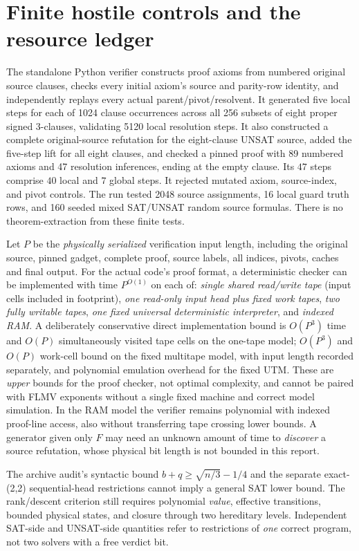\documentclass[11pt]{article}
\begin{document}
\section{Finite hostile controls and the resource ledger}
The standalone Python verifier  constructs proof axioms from numbered original source clauses, checks every initial axiom's source and parity-row identity, and independently replays every actual parent/pivot/resolvent. It generated five local steps for each of 1024 clause occurrences across all 256 subsets of eight proper signed 3-clauses, validating 5120 local resolution steps. It also constructed a complete original-source refutation for the eight-clause UNSAT source, added the five-step lift for all eight clauses, and checked a pinned proof with 89 numbered axioms and 47 resolution inferences, ending at the empty clause. Its $47$ steps comprise $40$ local and $7$ global steps. It rejected mutated axiom, source-index, and pivot controls. The run tested 2048 source assignments, 16 local guard truth rows, and 160 seeded mixed SAT/UNSAT random source formulas. There is no theorem-extraction from these finite tests.

Let $P$ be the \emph{physically serialized} verification input length, including the original source, pinned gadget, complete proof, source labels, all indices, pivots, caches and final output. For the actual code's proof format, a deterministic checker can be implemented with time $P^{O(1)}$ on each of: \emph{single shared read/write tape} (input cells included in footprint), \emph{one read-only input head plus fixed work tapes}, \emph{two fully writable tapes}, \emph{one fixed universal deterministic interpreter}, and \emph{indexed RAM}. A deliberately conservative direct implementation bound is $O(P^3)$ time and $O(P)$ simultaneously visited tape cells on the one-tape model; $O(P^3)$ and $O(P)$ work-cell bound on the fixed multitape model, with input length recorded separately, and polynomial emulation overhead for the fixed UTM. These are \emph{upper} bounds for the proof checker, not optimal complexity, and cannot be paired with FLMV exponents without a single fixed machine and correct model simulation. In the RAM model the verifier remains polynomial with indexed proof-line access, also without transferring tape crossing lower bounds. A generator given only $F$ may need an unknown amount of time to \emph{discover} a source refutation, whose physical bit length is not bounded in this report.

The archive audit's syntactic bound $b+q\ge\sqrt{n/3}-1/4$ and the separate exact-(2,2) sequential-head restrictions cannot imply a general SAT lower bound. The rank/descent criterion still requires polynomial \emph{value}, effective transitions, bounded physical states, and closure through two hereditary levels. Independent SAT-side and UNSAT-side quantities refer to restrictions of \emph{one} correct program, not two solvers with a free verdict bit.
\end{document}
